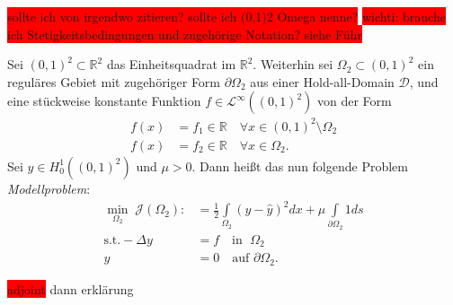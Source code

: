 \colorbox{red}{sollte ich von irgendwo zitieren? sollte ich (0,1)2 Omega nenne?}
\colorbox{red}{ wichti: brauche ich Stetigkeitsbedingungen und zugehörige Notation? siehe Führ}
\begin{defi}[Modellproblem]
	Sei $(0,1)^2 \subset \mathbb{R}^2$ das Einheitsquadrat im $\mathbb{R}^2$.
	Weiterhin sei $\Omega_2 \subset (0,1)^2$ ein reguläres Gebiet mit zugehöriger 		Form $\partial\Omega_2$ aus einer Hold-all-Domain $\mathcal{D}$, und eine stückweise konstante Funktion $f \in \mathcal{L}^\infty((0,1)^2)$ von der Form
	\begin{align*}
		f(x) &= f_1 \in \mathbb{R} \quad \forall x \in (0,1)^2\setminus \Omega_2 \\
		f(x) &= f_2 \in \mathbb{R} \quad \forall x \in \Omega_2.
	\end{align*}
	Sei $\hat{y} \in H^1_0((0,1)^2)$ und $\mu > 0$. Dann heißt das nun folgende Problem \textit{Modellproblem}:
	\begin{equation}\label{Modellproblem}
	\begin{aligned}
	\underset{\Omega_2}{\min}\; \mathcal{J}(\Omega_2) :&= \frac{1}{2}\underset{\Omega_2}{\int} (y - \hat{y})^2 dx + \mu\underset{\partial\Omega_2}{\int} 1 ds \\
	\text{s.t.} -\Delta y &= f \quad \text{in } \;\Omega_2 \\
	y &= 0  \quad \text{auf } \partial\Omega_2.
	\end{aligned}
	\end{equation}		
	
	\colorbox{red}{adjoint} dann erklärung
	
\end{defi}